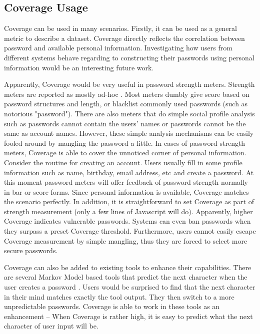 \subsection{Coverage Usage}
Coverage can be used in many scenarios. Firstly, it can be used as a general metric to describe a dataset. Coverage directly reflects the correlation between password and available personal information. Investigating how users from different systems behave regarding to constructing their passwords using personal information would be an interesting future work. 

Apparently, Coverage would be very useful in password strength meters. Strength meters are reported as mostly ad-hoc \cite{de2014very}. Most meters dumbly give score based on password structures and length, or blacklist commonly used passwords (such as notorious "password"). There are also meters that do simple social profile analysis such as passwords cannot contain the users' names or passwords cannot be the same as account names. However, these simple analysis mechanisms can be easily fooled around by mangling the password a little. In cases of password strength meters, Coverage is able to cover the unnoticed corner of personal information. Consider the routine for creating an account. Users usually fill in some profile information such as name, birthday, email address, etc and create a password. At this moment password meters will offer feedback of password strength normally in bar or score forms. Since personal information is available, Coverage matches the scenario perfectly. In addition, it is straightforward to set Coverage as part of strength measurement (only a few lines of Javascript will do). Apparently, higher Coverage indicates vulnerable passwords. Systems can even ban passwords when they surpass a preset Coverage threshold. Furthermore, users cannot easily escape Coverage measurement by simple mangling, thus they are forced to select more secure passwords.

Coverage can also be added to existing tools to enhance their capabilities. There are several Markov Model based tools that predict the next character when the user creates a password \cite{komanduri2014telepathwords}\cite{weir2010testing}. Users would be surprised to find that the next character in their mind matches exactly the tool output. They then switch to a more unpredictable passwords. Coverage is able to work in these tools as an enhancement -- When Coverage is rather high, it is easy to predict what the next character of user input will be.

